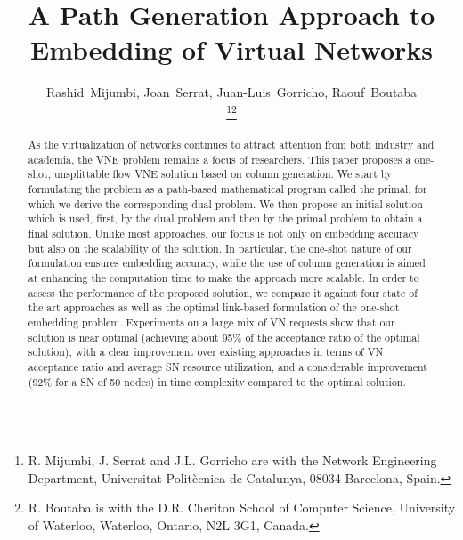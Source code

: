 \documentclass[journal]{IEEEtran}
\begin{document}
\title{A Path Generation Approach to Embedding of Virtual Networks}

\author{Rashid~Mijumbi, Joan~Serrat, Juan-Luis~Gorricho, Raouf~Boutaba

\thanks{R. Mijumbi, J. Serrat and J.L. Gorricho are with the Network Engineering Department, Universitat Polit\`{e}cnica de Catalunya, 08034 Barcelona, Spain.}\thanks{R. Boutaba is with the D.R. Cheriton School of Computer Science, University of Waterloo, Waterloo, Ontario, N2L 3G1, Canada.}

}















\maketitle



\begin{abstract}
As the virtualization of networks continues to attract attention from both industry and academia, the \ac{VNE} problem remains a focus of researchers. This paper proposes a one-shot, unsplittable flow \ac{VNE} solution based on column generation. We start by formulating the problem as a path-based mathematical program called the primal, for which we derive the corresponding dual problem. We then propose an initial solution which is used, first, by the dual problem and then by the primal problem to obtain a final solution. Unlike most approaches, our focus is not only on embedding accuracy but also on the scalability of the solution. In particular, the one-shot nature of our formulation ensures embedding accuracy, while the use of column generation is aimed at enhancing the computation time to make the approach more scalable. In order to assess the performance of the proposed solution, we compare it against four state of the art approaches as well as the optimal link-based formulation of the one-shot embedding problem. Experiments on a large mix of \ac{VN} requests show that our solution is near optimal (achieving about 95\% of the acceptance ratio of the optimal solution), with a clear improvement over existing approaches in terms of \ac{VN} acceptance ratio and average \ac{SN} resource utilization, and a considerable improvement (92\% for a \ac{SN} of 50 nodes) in time complexity compared to the optimal solution.

\end{abstract}
\end{document}
